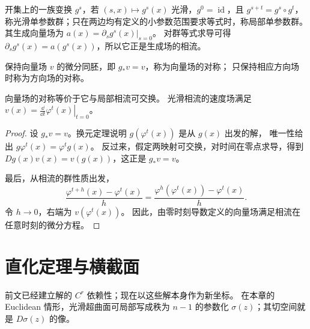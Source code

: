 \begin{definition}[光滑单参数变换群与生成场]\label{def:smooth-one-parameter}
开集上的一族变换 $g^s$，若 $(s,x)\mapsto g^s(x)$ 光滑，$g^0=\operatorname{id}$，且
$g^{s+t}=g^s\circ g^t$，称光滑单参数群；只在两边均有定义的小参数范围要求等式时，称局部单参数群。
其生成向量场为 $a(x)=\left.\partial_sg^s(x)\right|_{s=0}$。
对群等式求导可得 $\partial_sg^s(x)=a(g^s(x))$，所以它正是生成场的相流。
\end{definition}

\begin{definition}[向量场的对称]
保持向量场 $v$ 的微分同胚，即 $g_*v=v$，称为向量场的对称；
只保持相应方向场时称为方向场的对称。
\end{definition}
\begin{proposition}
向量场的对称等价于它与局部相流可交换。
光滑相流的速度场满足
$v(x)=\left.\frac{\dd}{\dd t}\varphi^t(x)\right|_{t=0}$。
\end{proposition}
\begin{proof}
设 $g_*v=v$。换元定理说明 $g(\varphi^t(x))$ 是从 $g(x)$ 出发的解，
唯一性给出 $g\varphi^t(x)=\varphi^t g(x)$。
反过来，假定两映射可交换，对时间在零点求导，得到
$Dg(x)v(x)=v(g(x))$，这正是 $g_*v=v$。

最后，从相流的群性质出发，
\[
 \frac{\varphi^{t+h}(x)-\varphi^t(x)}h
 =\frac{\varphi^h(\varphi^t(x))-\varphi^t(x)}h.
\]
令 $h\to0$，右端为 $v(\varphi^t(x))$。
因此，由零时刻导数定义的向量场满足相流在任意时刻的微分方程。
\end{proof}

\section{直化定理与横截面}
前文已经建立解的 $C^r$ 依赖性；现在以这些解本身作为新坐标。
在本章的 Euclidean 情形，光滑超曲面可局部写成秩为 $n-1$ 的参数化 $\sigma(z)$；其切空间就是 $D\sigma(z)$ 的像。

